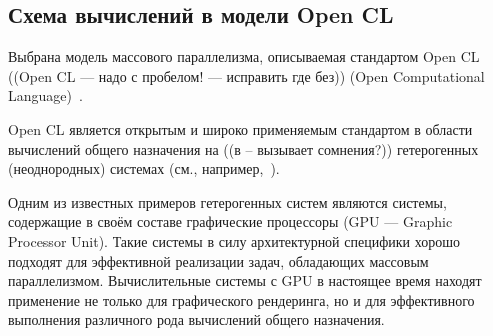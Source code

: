 

\subsection*{Схема вычислений в модели Open CL}
\label{sec:OCLprog}




Выбрана модель массового параллелизма,
описываемая стандартом Open CL ((Open CL --- надо с пробелом! --- исправить где без))
(Open Computational Language)~\cite{doc_OCL}.

Open CL является открытым и широко применяемым стандартом в области вычислений
общего назначения на ((в -- вызывает сомнения?))
гетерогенных (неоднородных) системах
(см., например,~\cite{paper_OCL_Komdiv, paper_Deg_Bogd}). %

Одним из известных примеров гетерогенных систем являются системы,
содержащие в своём составе графические процессоры (GPU --- Graphic Processor Unit).
Такие системы в силу архитектурной специфики  
хорошо подходят для эффективной реализации задач,
обладающих массовым параллелизмом.
Вычислительные системы с GPU в настоящее время находят применение не только для
графического рендеринга, но и для %
эффективного выполнения различного рода
вычислений общего назначения. 


